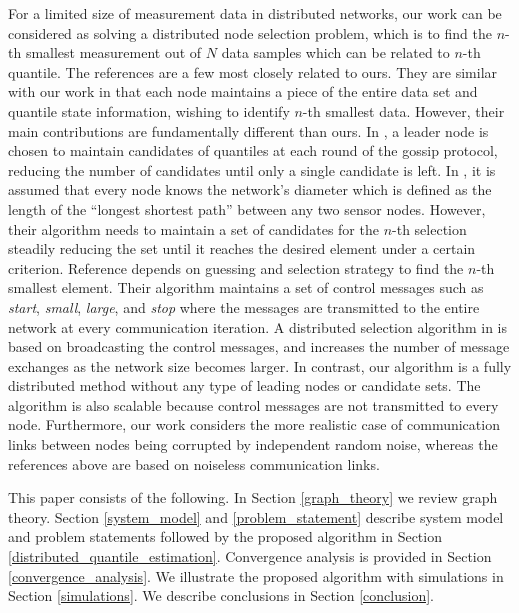 \documentclass[journal]{IEEEtran}
\begin{document}
For a limited size of measurement data in distributed networks, our work can be considered as solving a distributed node selection problem, which is to find the $n$-th smallest measurement out of $N$ data samples which can be related to $n$-th quantile. The references \cite{Kempe2003,Kuhn2007,Negro1997,SANTORO1992} are a few most closely related to ours. They are similar with our work in that each node maintains a piece of the entire data set and quantile state information, wishing to identify $n$-th smallest data. However, their main contributions are fundamentally different than ours. In \cite{Kempe2003}, a leader node is chosen to maintain candidates of quantiles at each round of the gossip protocol, reducing the number of candidates until only a single candidate is left. In \cite{Kuhn2007}, it is assumed that every node knows the network's diameter which is defined as the length of the ``longest shortest path'' between any two sensor nodes. However, their algorithm needs to maintain a set of candidates for the $n$-th selection steadily reducing the set until it reaches the desired element under a certain criterion. Reference \cite{Negro1997} depends on guessing and selection strategy to find the $n$-th smallest element. Their algorithm maintains a set of control messages such as \emph{start}, \emph{small}, \emph{large}, and \emph{stop} where the messages are transmitted to the entire network at every communication iteration. A distributed selection algorithm in \cite{SANTORO1992} is based on broadcasting the control messages, and increases the number of message exchanges as the network size becomes larger. In contrast, our algorithm is a fully distributed method without any type of leading nodes or candidate sets. The algorithm is also scalable because control messages are not transmitted to every node. Furthermore, our work considers the more realistic case of communication links between nodes being corrupted by independent random noise, whereas the references above are based on noiseless communication links.   


This paper consists of the following. In Section \ref{graph_theory} we review graph theory. Section \ref{system_model} and \ref{problem_statement} describe system model and problem statements followed by the proposed algorithm in Section \ref{distributed_quantile_estimation}. Convergence analysis is provided in Section \ref{convergence_analysis}. We illustrate the proposed algorithm with simulations in Section \ref{simulations}. We describe conclusions in Section \ref{conclusion}.
\end{document}
